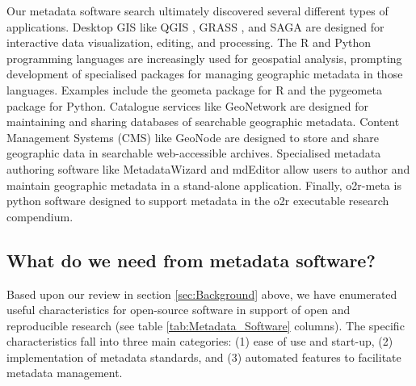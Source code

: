\documentclass{isprs} %
\begin{document}
Our metadata software search ultimately discovered several different types of applications.
Desktop GIS like QGIS \citep{QGIS2022}, GRASS \citep{grass2020}, and SAGA \citep{gmd-8-1991-2015} are designed for interactive data visualization, editing, and processing.
The R and Python programming languages are increasingly used for geospatial analysis, prompting development of specialised packages for managing geographic metadata in those languages. 
Examples include the geometa package \citep{blondel_2022} for R and the pygeometa package \citep{pygeometa} for Python.
Catalogue services like GeoNetwork \citep{geonetwork} are designed for maintaining and sharing databases of searchable geographic metadata.
Content Management Systems (CMS) like GeoNode \citep{geonode} are designed to store and share geographic data in searchable web-accessible archives.
Specialised metadata authoring software like MetadataWizard \citep{usgs} and mdEditor \citep{ADIwg} allow users to author and maintain geographic metadata in a stand-alone application.
Finally, o2r-meta \citep{nust_daniel_2021_5106499} is python software designed to support metadata in the o2r executable research compendium.

\subsection{What do we need from metadata software?}\label{metadataneeds}

Based upon our review in section \ref{sec:Background} above, we have enumerated useful characteristics for open-source software in support of open and reproducible research (see table \ref{tab:Metadata_Software} columns).
The specific characteristics fall into three main categories: (1) ease of use and start-up, (2) implementation of metadata standards, and (3) automated features to facilitate metadata management.
\end{document}

